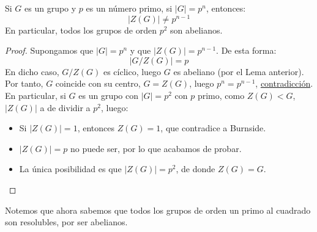 \begin{coro}
    Si $G$ es un grupo y $p$ es un número primo, si $|G| = p^n$, entonces:
    \begin{equation*}
        |Z(G)| \neq p^{n-1}
    \end{equation*}
    En particular, todos los grupos de orden $p^2$ son abelianos.
    \begin{proof}
        Supongamos que $|G| = p^n$ y que $|Z(G)| = p^{n-1}$. De esta forma:
        \begin{equation*}
            |G/Z(G)| = p
        \end{equation*}
        En dicho caso, $G/Z(G)$ es cíclico, luego $G$ es abeliano (por el Lema anterior). Por tanto, $G$ coincide con su centro, $G = Z(G)$, luego $p^n = p^{n-1}$, \underline{contradicción}.\\

        \noindent
        En particular, si $G$ es un grupo con $|G| = p^2$ con $p$ primo, como $Z(G) < G$, $|Z(G)| $ a de dividir a $p^2$, luego:
        \begin{itemize}
            \item Si $|Z(G)| = 1$, entonces $Z(G) = 1$, que contradice a Burnside.
            \item $|Z(G)| = p$ no puede ser, por lo que acabamos de probar.
            \item La única posibilidad es que $|Z(G)| = p^2$, de donde $Z(G) = G$.
        \end{itemize}
    \end{proof}
\end{coro}

\begin{observacion}
    Notemos que ahora sabemos que todos los grupos de orden un primo al cuadrado son resolubles, por ser abelianos.
\end{observacion}


